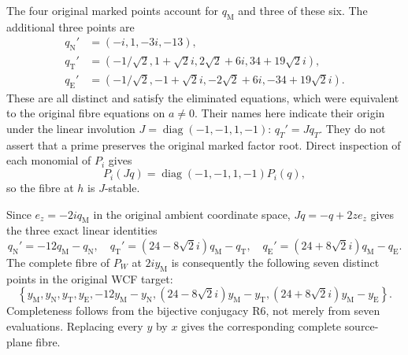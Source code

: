 \documentclass[11pt]{article}
\begin{document}
The four original marked points account for $q_{\mathrm M}$ and
three of these six. The additional three points are
\begin{align*}
 q_{\mathrm N}'&=(-i,1,-3i,-13),\\
 q_{\mathrm T}'&=(-1/\sqrt2,1+\sqrt2 i,2\sqrt2+6i,
                                      34+19\sqrt2 i),\\
 q_{\mathrm E}'&=(-1/\sqrt2,-1+\sqrt2 i,-2\sqrt2+6i,
                                      -34+19\sqrt2 i).
\end{align*}
These are all distinct and satisfy the eliminated equations, which
were equivalent to the original fibre equations on $a\ne0$.
Their names here indicate their origin under the linear involution
$J=\operatorname{diag}(-1,-1,1,-1)$:
$q_T'=Jq_T$. They do not assert that a prime preserves the original
marked factor root. Direct inspection of each monomial of $P_i$
gives
\[
 P_i(Jq)=\operatorname{diag}(-1,-1,1,-1)P_i(q),
\]
so the fibre at $h$ is $J$-stable.

Since $e_z=-2i q_{\mathrm M}$ in the original ambient coordinate
space, $Jq=-q+2z e_z$ gives the three exact linear identities
\[
 q_{\mathrm N}'=-12q_{\mathrm M}-q_{\mathrm N},\quad
 q_{\mathrm T}'=(24-8\sqrt2 i)q_{\mathrm M}-q_{\mathrm T},\quad
 q_{\mathrm E}'=(24+8\sqrt2 i)q_{\mathrm M}-q_{\mathrm E}.
\]
The complete fibre of $P_W$ at $2i y_{\mathrm M}$ is consequently
the following seven distinct points in the original WCF target:
\begin{equation}
 \left\{y_{\mathrm M},y_{\mathrm N},y_{\mathrm T},y_{\mathrm E},
 -12y_{\mathrm M}-y_{\mathrm N},
 (24-8\sqrt2 i)y_{\mathrm M}-y_{\mathrm T},
 (24+8\sqrt2 i)y_{\mathrm M}-y_{\mathrm E}\right\}.\tag{R10}
\end{equation}
Completeness follows from the bijective conjugacy R6, not merely from
seven evaluations. Replacing every $y$ by $x$ gives the corresponding
complete source-plane fibre.
\end{document}
